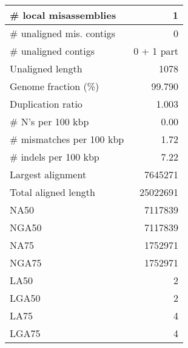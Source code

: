 \documentclass[12pt,a4paper]{article}
\begin{document}
\begin{table}[ht]
\begin{center}
\begin{tabular}{|l*{1}{|r}|}
\# local misassemblies & 1 \\ \hline
\# unaligned mis. contigs & 0 \\ \hline
\# unaligned contigs & 0 + 1 part \\ \hline
Unaligned length & 1078 \\ \hline
Genome fraction (\%) & 99.790 \\ \hline
Duplication ratio & 1.003 \\ \hline
\# N's per 100 kbp & 0.00 \\ \hline
\# mismatches per 100 kbp & 1.72 \\ \hline
\# indels per 100 kbp & 7.22 \\ \hline
Largest alignment & 7645271 \\ \hline
Total aligned length & 25022691 \\ \hline
NA50 & 7117839 \\ \hline
NGA50 & 7117839 \\ \hline
NA75 & 1752971 \\ \hline
NGA75 & 1752971 \\ \hline
LA50 & 2 \\ \hline
LGA50 & 2 \\ \hline
LA75 & 4 \\ \hline
LGA75 & 4 \\ \hline
\end{tabular}
\end{center}
\end{table}
\end{document}
